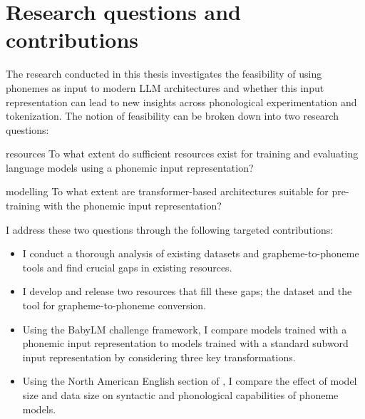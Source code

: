 


\section{Research questions and contributions}

The research conducted in this thesis investigates the feasibility of using phonemes as input to modern LLM architectures and whether this input representation can lead to new insights across phonological experimentation and tokenization. The notion of feasibility can be broken down into two research questions:

\begin{question}{}{resources}
    To what extent do sufficient resources exist for training and evaluating language models using a phonemic input representation?
\end{question}

\begin{question}{}{modelling}
    To what extent are transformer-based architectures suitable for pre-training with the phonemic input representation?
\end{question}

I address these two questions through the following targeted contributions:

\begin{itemize}
    \item I conduct a thorough analysis of existing datasets and grapheme-to-phoneme tools and find crucial gaps in existing resources.
    \item I develop and release two resources that fill these gaps; the \ipachildes dataset and the \gpp tool for grapheme-to-phoneme conversion.
    \item Using the BabyLM challenge framework, I compare models trained with a phonemic input representation to models trained with a standard subword input representation by considering three key transformations.
    \item Using the North American English section of \ipachildes, I compare the effect of model size and data size on syntactic and phonological capabilities of phoneme models. 
\end{itemize}

